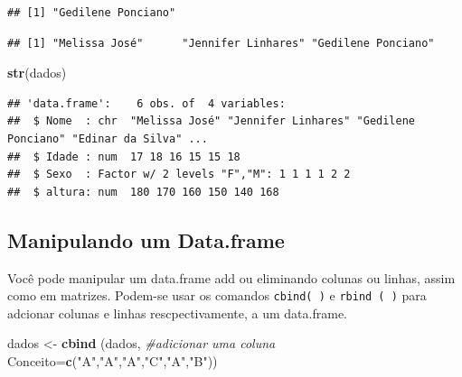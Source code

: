 \documentclass[]{book}
\newenvironment{Shaded}{\begin{snugshade}}{\end{snugshade}}
\newcommand{\CommentTok}[1]{\textcolor[rgb]{0.56,0.35,0.01}{\textit{#1}}}
\newcommand{\DataTypeTok}[1]{\textcolor[rgb]{0.13,0.29,0.53}{#1}}
\newcommand{\DecValTok}[1]{\textcolor[rgb]{0.00,0.00,0.81}{#1}}
\newcommand{\KeywordTok}[1]{\textcolor[rgb]{0.13,0.29,0.53}{\textbf{#1}}}
\newcommand{\NormalTok}[1]{#1}
\newcommand{\OperatorTok}[1]{\textcolor[rgb]{0.81,0.36,0.00}{\textbf{#1}}}
\newcommand{\StringTok}[1]{\textcolor[rgb]{0.31,0.60,0.02}{#1}}
\begin{document}
\begin{verbatim}
## [1] "Gedilene Ponciano"
\end{verbatim}

\begin{Shaded}
\end{Shaded}

\begin{verbatim}
## [1] "Melissa José"      "Jennifer Linhares" "Gedilene Ponciano"
\end{verbatim}

\begin{Shaded}
\begin{Highlighting}[]
\KeywordTok{str}\NormalTok{(dados)}
\end{Highlighting}
\end{Shaded}

\begin{verbatim}
## 'data.frame':    6 obs. of  4 variables:
##  $ Nome  : chr  "Melissa José" "Jennifer Linhares" "Gedilene Ponciano" "Edinar da Silva" ...
##  $ Idade : num  17 18 16 15 15 18
##  $ Sexo  : Factor w/ 2 levels "F","M": 1 1 1 1 2 2
##  $ altura: num  180 170 160 150 140 168
\end{verbatim}

\hypertarget{manipulando-um-data.frame}{%
\subsection{Manipulando um Data.frame}\label{manipulando-um-data.frame}}

Você pode manipular um data.frame add ou eliminando colunas ou linhas, assim como em matrizes. Podem-se usar os comandos \texttt{cbind(\ )} e \texttt{rbind\ (\ )} para adcionar colunas e linhas rescpectivamente, a um data.frame.

\begin{Shaded}
\begin{Highlighting}[]
\NormalTok{dados <-}\StringTok{ }\KeywordTok{cbind}\NormalTok{ (dados, }\CommentTok{#adicionar uma coluna}
               \DataTypeTok{Conceito=}\KeywordTok{c}\NormalTok{(}\StringTok{"A"}\NormalTok{,}\StringTok{"A"}\NormalTok{,}\StringTok{"A"}\NormalTok{,}\StringTok{"C"}\NormalTok{,}\StringTok{"A"}\NormalTok{,}\StringTok{"B"}\NormalTok{))}
\end{Highlighting}
\end{Shaded}
\end{document}
